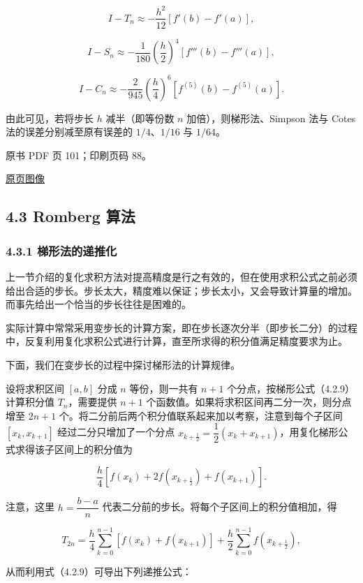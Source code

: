 \[
I-T_n\approx-\frac{h^2}{12}[f'(b)-f'(a)],
\tag{4.2.15}
\]

\[
I-S_n\approx-\frac1{180}\left(\frac h2\right)^4[f'''(b)-f'''(a)],
\tag{4.2.16}
\]

\[
I-C_n\approx-\frac2{945}\left(\frac h4\right)^6[f^{(5)}(b)-f^{(5)}(a)].
\tag{4.2.17}
\]

由此可见，若将步长 \(h\) 减半（即等份数 \(n\) 加倍），则梯形法、Simpson 法与 Cotes 法的误差分别减至原有误差的 \(1/4\)、\(1/16\) 与 \(1/64\)。

\clearpage

原书 PDF 页 101；印刷页码 88。

\href{source-images/pdf-101.jpeg}{原页图像}

\subsection{4.3 Romberg 算法}\label{ch04a-romberg-ux7b97ux6cd5}

\subsubsection{4.3.1 梯形法的递推化}\label{ch04a-ux68afux5f62ux6cd5ux7684ux9012ux63a8ux5316}

上一节介绍的复化求积方法对提高精度是行之有效的，但在使用求积公式之前必须给出合适的步长。步长太大，精度难以保证；步长太小，又会导致计算量的增加。而事先给出一个恰当的步长往往是困难的。

实际计算中常常采用变步长的计算方案，即在步长逐次分半（即步长二分）的过程中，反复利用复化求积公式进行计算，直至所求得的积分值满足精度要求为止。

下面，我们在变步长的过程中探讨梯形法的计算规律。

设将求积区间 \([a,b]\) 分成 \(n\) 等份，则一共有 \(n+1\) 个分点，按梯形公式（4.2.9）计算积分值 \(T_n\)，需要提供 \(n+1\) 个函数值。如果将求积区间再二分一次，则分点增至 \(2n+1\) 个。将二分前后两个积分值联系起来加以考察，注意到每个子区间 \([x_k,x_{k+1}]\) 经过二分只增加了一个分点 \(x_{k+\frac12}=\dfrac12(x_k+x_{k+1})\)，用复化梯形公式求得该子区间上的积分值为

\[
\frac h4[f(x_k)+2f(x_{k+\frac12})+f(x_{k+1})].
\]

注意，这里 \(h=\dfrac{b-a}{n}\) 代表二分前的步长。将每个子区间上的积分值相加，得

\[
T_{2n}=\frac h4\sum_{k=0}^{n-1}[f(x_k)+f(x_{k+1})]+\frac h2\sum_{k=0}^{n-1}f(x_{k+\frac12}),
\]

从而利用式（4.2.9）可导出下列递推公式：

